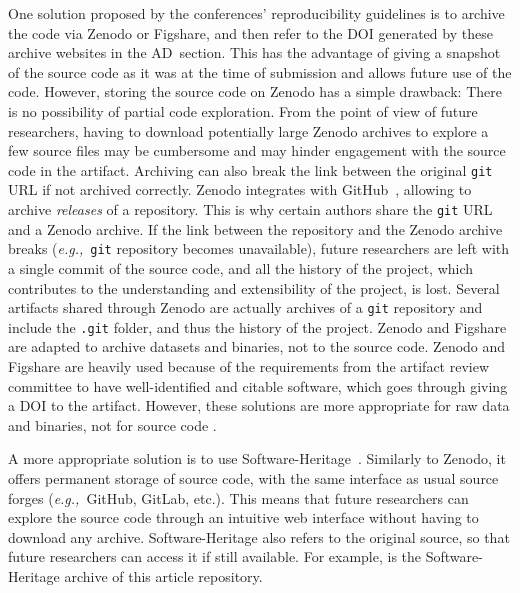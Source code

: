 \documentclass[sigconf,natbib=false]{acmart}
\newcommand{\eg}{\emph{e.g.,}}
\newcommand{\ad}{AD}
\begin{document}
One solution proposed by the conferences' reproducibility guidelines is to archive the code via Zenodo or Figshare, and then refer to the DOI generated by these archive websites in the \ad\ section.
This has the advantage of giving a snapshot of the source code as it was at the time of submission and allows future use of the code.
However, storing the source code on Zenodo has a simple drawback: There is no possibility of partial code exploration.
From the point of view of future researchers, having to download potentially large Zenodo archives to explore a few source files may be cumbersome and may hinder engagement with the source code in the artifact. 
Archiving can also break the link between the original \texttt{git} URL if not archived correctly.
Zenodo integrates with GitHub\ \cite{github_zenodo}, allowing to archive \emph{releases} of a repository.
This is why certain authors share the \texttt{git} URL and a Zenodo archive.
If the link between the repository and the Zenodo archive breaks (\eg\ \texttt{git} repository becomes unavailable), future researchers are left with a single commit of the source code, and all the history of the project, which contributes to the understanding and extensibility of the project, is lost.
Several artifacts shared through Zenodo are actually archives of a \texttt{git} repository and include the \texttt{.git} folder, and thus the history of the project.
Zenodo and Figshare are adapted to archive datasets and binaries, not to the source code.
Zenodo and Figshare are heavily used because of the requirements from the artifact review committee to have well-identified and citable software, which goes through giving a DOI to the artifact.
However, these solutions are more appropriate for raw data and binaries, not for source code \cite{alliez2019attributing, software_heritage_2017}.

A more appropriate solution is to use Software-Heritage\ \cite{swheritage, di2017software}.
Similarly to Zenodo, it offers permanent storage of source code, with the same interface as usual source forges (\eg\ GitHub, GitLab, etc.).
This means that future researchers can explore the source code through an intuitive web interface without having to download any archive.
Software-Heritage also refers to the original source, so that future researchers can access it if still available.
For example, \cite{artefact-lifetime} is the Software-Heritage archive of this article repository.
\end{document}
